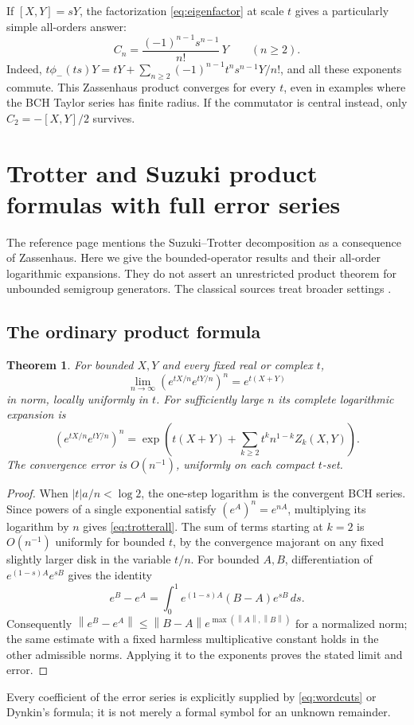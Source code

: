 \documentclass[11pt]{article}
\numberwithin{equation}{section}
\newtheorem{theorem}{Theorem}[section]
\theoremstyle{definition}
\theoremstyle{remark}
\newcommand{\norm}[1]{\left\lVert#1\right\rVert}
\begin{document}
If $[X,Y]=sY$, the factorization \eqref{eq:eigenfactor} at scale $t$
gives a particularly simple all-orders answer:
\begin{equation}\label{eq:eigenZassenhaus}
 C_n=\frac{(-1)^{n-1}s^{n-1}}{n!}\,Y\qquad(n\geq2).
\end{equation}
Indeed, $t\phi_-(ts)Y=tY+
\sum_{n\geq2}(-1)^{n-1}t^ns^{n-1}Y/n!$, and all these exponents
commute. This Zassenhaus product converges for every $t$, even in
examples where the BCH Taylor series has finite radius. If the
commutator is central instead, only $C_2=-[X,Y]/2$ survives.

\section{Trotter and Suzuki product formulas with full error series}
\label{sec:splitting}
The reference page mentions the Suzuki--Trotter decomposition as a
consequence of Zassenhaus. Here we give the bounded-operator results
and their all-order logarithmic expansions. They do not assert an
unrestricted product theorem for unbounded semigroup generators.
The classical sources treat broader settings \cite{trotter,suzuki}.

\subsection{The ordinary product formula}
\begin{theorem}\label{thm:trotter}
For bounded $X,Y$ and every fixed real or complex $t$,
\begin{equation}\label{eq:trotter}
 \lim_{n\to\infty}(e^{tX/n}e^{tY/n})^n=e^{t(X+Y)}
\end{equation}
in norm, locally uniformly in $t$. For sufficiently large $n$ its
complete logarithmic expansion is
\begin{equation}\label{eq:trotterall}
 (e^{tX/n}e^{tY/n})^n=
 \exp\left(t(X+Y)+\sum_{k\geq2}t^k n^{1-k}Z_k(X,Y)\right).
\end{equation}
The convergence error is $O(n^{-1})$, uniformly on each compact
$t$-set.
\end{theorem}
\begin{proof}
When $|t|a/n<\log2$, the one-step logarithm is the convergent BCH
series. Since powers of a single exponential satisfy
$(e^A)^n=e^{nA}$, multiplying its logarithm by $n$ gives
\eqref{eq:trotterall}. The sum of terms starting at $k=2$ is
$O(n^{-1})$ uniformly for bounded $t$, by the convergence majorant
on any fixed slightly larger disk in the variable $t/n$.
For bounded $A,B$, differentiation of
$e^{(1-s)A}e^{sB}$ gives the identity
\[
 e^B-e^A=\int_0^1e^{(1-s)A}(B-A)e^{sB}\,ds.
\]
Consequently $\norm{e^B-e^A}\leq
\norm{B-A}e^{\max(\norm{A},\norm{B})}$ for a normalized norm;
the same estimate with a fixed harmless multiplicative constant
holds in the other admissible norms. Applying it to the exponents
proves the stated limit and error.
\end{proof}
Every coefficient of the error series is explicitly supplied by
\eqref{eq:wordcuts} or Dynkin's formula; it is not merely a formal
symbol for an unknown remainder.
\end{document}
